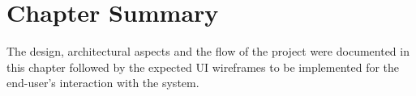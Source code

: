 
\section{Chapter Summary}
The design, architectural aspects and the flow of the project were documented in this chapter followed by the expected UI wireframes to be implemented for the end-user's interaction with the system.
